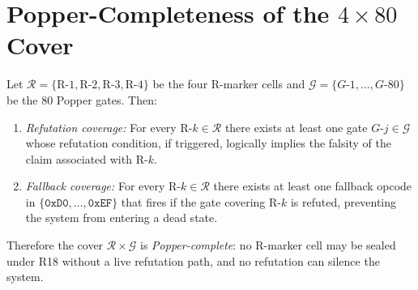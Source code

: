 \section{Popper-Completeness of the $4{\times}80$ Cover}
\label{sec74:popper-completeness}

\begin{theorem}
\label{thm74:popper-completeness}
Let $\mathcal{R} = \{\text{R-1},\text{R-2},\text{R-3},\text{R-4}\}$ be
the four R-marker cells and $\mathcal{G} = \{G\text{-}1,\ldots,G\text{-}80\}$
be the 80 Popper gates.  Then:
\begin{enumerate}
  \item[(i)] \emph{Refutation coverage:} For every $\text{R-}k \in
    \mathcal{R}$ there exists at least one gate $G\text{-}j \in \mathcal{G}$
    whose refutation condition, if triggered, logically implies the
    falsity of the claim associated with R-$k$.
  \item[(ii)] \emph{Fallback coverage:} For every $\text{R-}k \in
    \mathcal{R}$ there exists at least one fallback opcode in
    $\{\mathtt{0xD0},\ldots,\mathtt{0xEF}\}$ that fires if the gate
    covering R-$k$ is refuted, preventing the system from entering a
    dead state.
\end{enumerate}
Therefore the cover $\mathcal{R} \times \mathcal{G}$ is
\emph{Popper-complete}: no R-marker cell may be sealed under R18
without a live refutation path, and no refutation can silence the
system.
\end{theorem}
